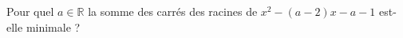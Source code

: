 Pour quel $a \in \mathbb{R}$ la somme des carrés des racines de $x^2 - (a - 2)x - a - 1$ est-elle minimale ?
